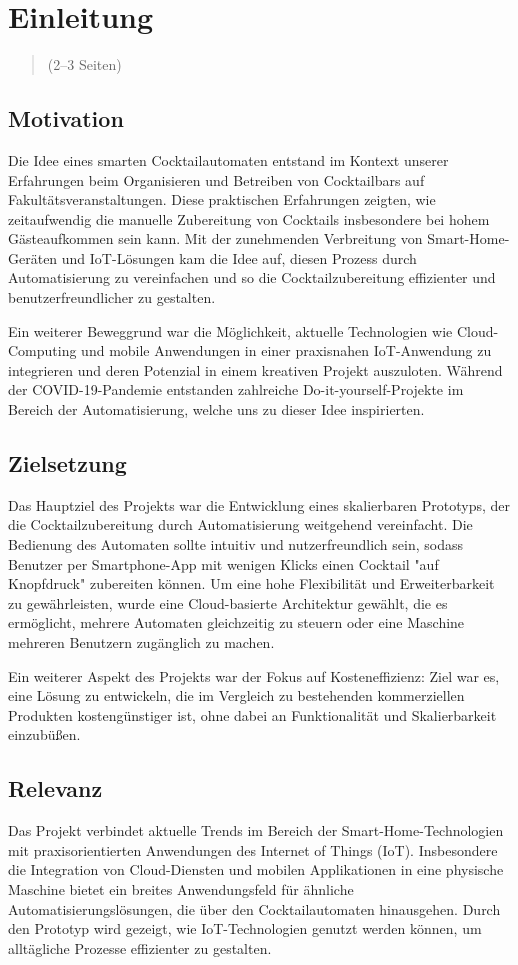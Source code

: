 \section{Einleitung}
\begin{quote}
  (2–3 Seiten)
\end{quote}
\subsection{Motivation}
Die Idee eines smarten Cocktailautomaten entstand im Kontext unserer Erfahrungen beim Organisieren 
und Betreiben von Cocktailbars auf Fakultätsveranstaltungen. Diese praktischen Erfahrungen zeigten, 
wie zeitaufwendig die manuelle Zubereitung von Cocktails insbesondere bei hohem Gästeaufkommen sein 
kann. Mit der zunehmenden Verbreitung von Smart-Home-Geräten und IoT-Lösungen kam die Idee auf, 
diesen Prozess durch Automatisierung zu vereinfachen und so die Cocktailzubereitung effizienter und 
benutzerfreundlicher zu gestalten. 

Ein weiterer Beweggrund war die Möglichkeit, aktuelle Technologien wie Cloud-Computing und mobile 
Anwendungen in einer praxisnahen IoT-Anwendung zu integrieren und deren Potenzial in einem kreativen 
Projekt auszuloten. Während der COVID-19-Pandemie entstanden zahlreiche Do-it-yourself-Projekte im 
Bereich der Automatisierung, welche uns zu dieser Idee inspirierten.

\subsection{Zielsetzung}
Das Hauptziel des Projekts war die Entwicklung eines skalierbaren Prototyps, der die 
Cocktailzubereitung durch Automatisierung weitgehend vereinfacht. Die Bedienung des Automaten 
sollte intuitiv und nutzerfreundlich sein, sodass Benutzer per Smartphone-App mit wenigen Klicks 
einen Cocktail "auf Knopfdruck" zubereiten können. Um eine hohe Flexibilität und Erweiterbarkeit 
zu gewährleisten, wurde eine Cloud-basierte Architektur gewählt, die es ermöglicht, mehrere 
Automaten gleichzeitig zu steuern oder eine Maschine mehreren Benutzern zugänglich zu machen. 

Ein weiterer Aspekt des Projekts war der Fokus auf Kosteneffizienz: Ziel war es, eine Lösung zu 
entwickeln, die im Vergleich zu bestehenden kommerziellen Produkten kostengünstiger ist, ohne dabei 
an Funktionalität und Skalierbarkeit einzubüßen.

\subsection{Relevanz}
Das Projekt verbindet aktuelle Trends im Bereich der Smart-Home-Technologien mit praxisorientierten 
Anwendungen des Internet of Things (IoT). Insbesondere die Integration von Cloud-Diensten und 
mobilen Applikationen in eine physische Maschine bietet ein breites Anwendungsfeld für ähnliche 
Automatisierungslösungen, die über den Cocktailautomaten hinausgehen. Durch den Prototyp wird 
gezeigt, wie IoT-Technologien genutzt werden können, um alltägliche Prozesse effizienter zu 
gestalten. 

